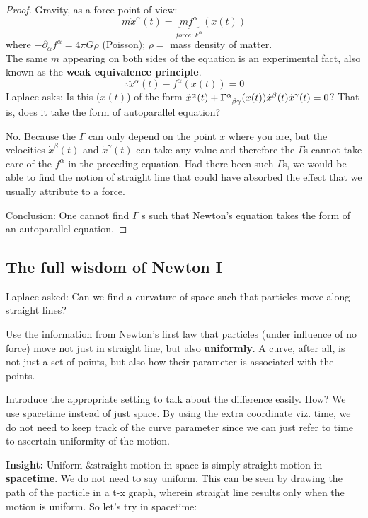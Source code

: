 \begin{proof}
Gravity, as a force point of view:
\[
m\ddot{x}^{\alpha}(t) = \underbrace{mf^{\alpha}}_{force : F^{\alpha}}(x(t))
\]
where $-\partial_{\alpha} f^{\alpha} = 4 \pi G \rho$ (Poisson); $\rho =$ mass density of matter. \\
The same $m$ appearing on both sides of the equation is an experimental fact, also known as the \textbf{weak equivalence principle}.
\[
\therefore \ddot{x}^{\alpha}(t) - f^{\alpha}(x(t)) = 0
\]
Laplace asks: Is this ($\ddot{x}(t)$) of the form $\ddot{x}^{\alpha}(t) + \ccf{\alpha}{\beta \gamma}(x(t)) \dot{x}^{\beta}(t) \dot{x}^{\gamma}(t) = 0$? That is, does it take the form of autoparallel equation?

No. Because the $\Gamma$ can only depend on the point $x$ where you are, but the velocities $\dot{x}^{\beta}(t)$ and $\dot{x}^{\gamma}(t)$ can take any value and therefore the $\Gamma$s cannot take care of the $f^{\alpha}$ in the preceding equation. Had there been such $\Gamma$s, we would be able to find the notion of straight line that could have absorbed the effect that we usually attribute to a force.

Conclusion: One cannot find $\Gamma$ s such that Newton's equation takes the form of an autoparallel equation.
\end{proof}

\subsection{The full wisdom of Newton I}
Laplace asked: Can we find a curvature of space such that particles move along straight lines?

Use the information from Newton's first law that particles (under influence of no force) move not just in straight line, but also \textbf{uniformly}. A curve, after all, is not just a set of points, but also how their parameter is associated with the points.

Introduce the appropriate setting to talk about the difference easily. How? We use spacetime instead of just space. By using the extra coordinate viz. time, we do not need to keep track of the curve parameter since we can just refer to time to ascertain uniformity of the motion.

\textbf{Insight:} $\boxed{\text{Uniform \& straight motion}}$ in space is simply straight motion in \textbf{spacetime}. We do not need to say uniform. This can be seen by drawing the path of the particle in a t-x graph, wherein straight line results only when the motion is uniform. So let's try in spacetime: \\ 

